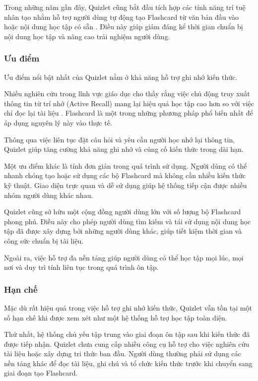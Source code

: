 Trong những năm gần đây, Quizlet cũng bắt đầu tích hợp các tính năng trí tuệ nhân tạo nhằm hỗ trợ người dùng tự động tạo Flashcard từ văn bản đầu vào hoặc nội dung học tập có sẵn \cite{quizletAIFlashcardGenerator}. Điều này giúp giảm đáng kể thời gian chuẩn bị nội dung học tập và nâng cao trải nghiệm người dùng.

\subsubsection{Ưu điểm}

Ưu điểm nổi bật nhất của Quizlet nằm ở khả năng hỗ trợ ghi nhớ kiến thức.

Nhiều nghiên cứu trong lĩnh vực giáo dục cho thấy rằng việc chủ động truy xuất thông tin từ trí nhớ (Active Recall) mang lại hiệu quả học tập cao hơn so với việc chỉ đọc lại tài liệu \cite{roediger2006testenhanced,dunlosky2013effectivelearning}. Flashcard là một trong những phương pháp phổ biến nhất để áp dụng nguyên lý này vào thực tế.

Thông qua việc liên tục đặt câu hỏi và yêu cầu người học nhớ lại thông tin, Quizlet giúp tăng cường khả năng ghi nhớ và củng cố kiến thức trong dài hạn.

Một ưu điểm khác là tính đơn giản trong quá trình sử dụng. Người dùng có thể nhanh chóng tạo hoặc sử dụng các bộ Flashcard mà không cần nhiều kiến thức kỹ thuật. Giao diện trực quan và dễ sử dụng giúp hệ thống tiếp cận được nhiều nhóm người dùng khác nhau.

Quizlet cũng sở hữu một cộng đồng người dùng lớn với số lượng bộ Flashcard phong phú. Điều này cho phép người dùng tìm kiếm và tái sử dụng nội dung học tập đã được xây dựng bởi những người dùng khác, giúp tiết kiệm thời gian và công sức chuẩn bị tài liệu.

Ngoài ra, việc hỗ trợ đa nền tảng giúp người dùng có thể học tập mọi lúc, mọi nơi và duy trì tính liên tục trong quá trình ôn tập.

\subsubsection{Hạn chế}

Mặc dù rất hiệu quả trong việc hỗ trợ ghi nhớ kiến thức, Quizlet vẫn tồn tại một số hạn chế khi được xem xét như một hệ thống hỗ trợ học tập toàn diện.

Thứ nhất, hệ thống chủ yếu tập trung vào giai đoạn ôn tập sau khi kiến thức đã được tiếp nhận. Quizlet chưa cung cấp nhiều công cụ hỗ trợ cho việc nghiên cứu tài liệu hoặc xây dựng tri thức ban đầu. Người dùng thường phải sử dụng các nền tảng khác để đọc tài liệu, ghi chú và tổ chức kiến thức trước khi chuyển sang giai đoạn tạo Flashcard.

